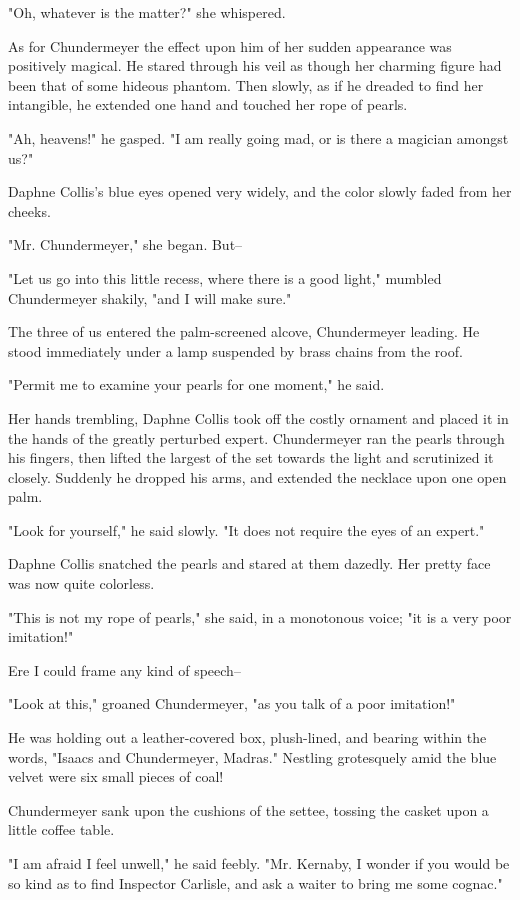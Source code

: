 "Oh, whatever is the matter?" she whispered.

As for Chundermeyer the effect upon him of her sudden appearance was
positively magical. He stared through his veil as though her charming
figure had been that of some hideous phantom. Then slowly, as if he
dreaded to find her intangible, he extended one hand and touched her
rope of pearls.

"Ah, heavens!" he gasped. "I am really going mad, or is there a
magician amongst us?"

Daphne Collis's blue eyes opened very widely, and the color slowly
faded from her cheeks.

"Mr. Chundermeyer," she began. But--

"Let us go into this little recess, where there is a good light,"
mumbled Chundermeyer shakily, "and I will make sure."

The three of us entered the palm-screened alcove, Chundermeyer
leading. He stood immediately under a lamp suspended by brass chains
from the roof.

"Permit me to examine your pearls for one moment," he said.

Her hands trembling, Daphne Collis took off the costly ornament and
placed it in the hands of the greatly perturbed expert. Chundermeyer
ran the pearls through his fingers, then lifted the largest of the set
towards the light and scrutinized it closely. Suddenly he dropped his
arms, and extended the necklace upon one open palm.

"Look for yourself," he said slowly. "It does not require the eyes of
an expert."

Daphne Collis snatched the pearls and stared at them dazedly. Her
pretty face was now quite colorless.

"This is not my rope of pearls," she said, in a monotonous voice; "it
is a very poor imitation!"

Ere I could frame any kind of speech--

"Look at this," groaned Chundermeyer, "as you talk of a poor
imitation!"

He was holding out a leather-covered box, plush-lined, and bearing
within the words, "Isaacs and Chundermeyer, Madras." Nestling
grotesquely amid the blue velvet were six small pieces of coal!

Chundermeyer sank upon the cushions of the settee, tossing the casket
upon a little coffee table.

"I am afraid I feel unwell," he said feebly. "Mr. Kernaby, I wonder if
you would be so kind as to find Inspector Carlisle, and ask a waiter
to bring me some cognac."

